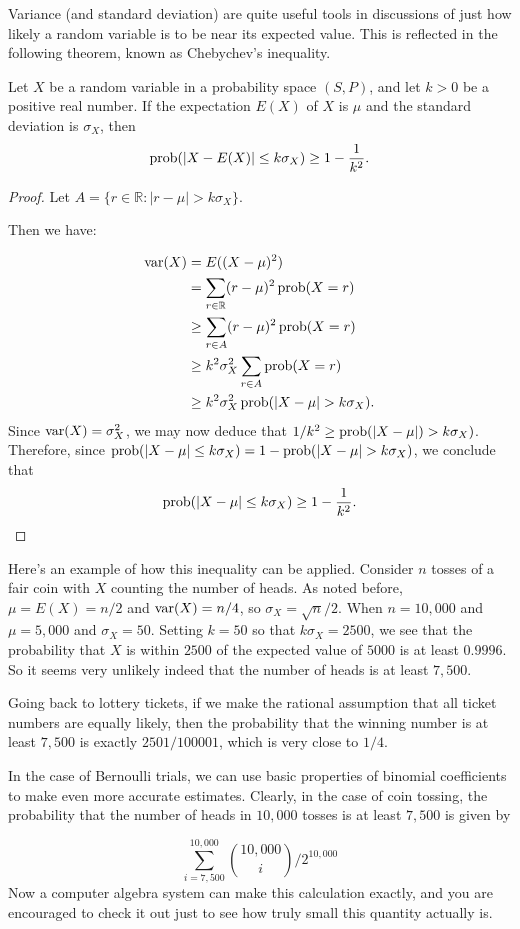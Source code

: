 Variance (and standard deviation) are quite useful tools in discussions of 
just how likely a random variable is to be near its expected value.
This is reflected in the following theorem, known as Chebychev's
inequality.

\begin{theorem}
Let $X$ be a random variable in a probability space $(S,P)$, and
let $k>0$ be a positive real number.  If the expectation $E(X)$ of
$X$ is $\mu$ and the standard deviation is $\sigma_X$, then
\[
\operatorname{prob}(|X- E(X)|\le k\sigma_X)\ge 1-\frac{1}{k^2}.
\]
\end{theorem}
\begin{proof}
Let $A=\{r\in \mathbb{R}:|r-\mu|>k\sigma_X\}$.

Then we have:

\begin{align*}
\var(X) &= E((X-\mu)^2)\\
        &= \sum_{r\in \mathbb{R}}(r-\mu)^2\prob(X=r)\\
        &\ge \sum_{r\in A}(r-\mu)^2\prob(X=r)\\
        &\ge k^2\sigma_X^2\sum_{r\in A}\prob(X=r)\\
        &\ge k^2\sigma_X^2\prob(|X-\mu|>k\sigma_X).
\end{align*}
Since $\operatorname{var}(X)=\sigma_X^2$, we may now deduce that $1/k^2\geq
\operatorname{prob}(|X-\mu|)>k\sigma_X)$.  Therefore, since $\prob(|X-\mu|\le
k\sigma_X)=1-\prob(|X-\mu|> k\sigma_X)$, we conclude that
\[
\operatorname{prob}(|X- \mu|\le k\sigma_X)\ge 1-\frac{1}{k^2}.
\]
\end{proof}

\begin{example}
Here's an example of how this inequality can be applied.
Consider $n$ tosses of a fair coin with $X$ counting the
number of heads.  As noted before, $\mu=E(X)=n/2$ and
$\operatorname{var}(X)=n/4$, so $\sigma_X=\sqrt{n}/2$.   When $n=10,000$ and
$\mu=5,000$ and $\sigma_X=50$.   Setting $k=50$ so that
$k\sigma_X=2500$, we see that the probability that $X$ is within 
$2500$ of the expected value of $5000$ is at least $0.9996$.
So it seems very unlikely indeed that the number of heads 
is at least $7,500$.

Going back to lottery tickets, if we make the rational
assumption that all ticket numbers are equally likely,
then the probability that the winning number is at least
$7,500$ is exactly $2501/100001$, which is very close to $1/4$.
\end{example}

\begin{example}
In the case of Bernoulli trials, we can use basic properties
of binomial coefficients to make even more accurate 
estimates.  Clearly, in the case of coin tossing,
the probability that the number of heads in $10,000$ tosses
is at least $7,500$ is given by

\[
\sum_{i = 7,500}^{10,000} \binom{10,000}{i}/2^{10,000}
\]
Now a computer algebra system can make this calculation exactly, and
you are encouraged to check it out just to see how truly small this
quantity actually is.
\end{example}

